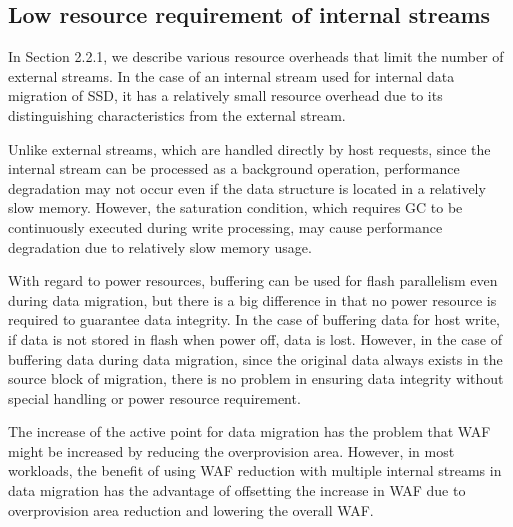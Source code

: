 \subsection{Low resource requirement of internal streams}

In Section 2.2.1, we describe various resource overheads that limit the number of external streams.
In the case of an internal stream used for internal data migration of SSD, 
it has a relatively small resource overhead due to its distinguishing characteristics from the external stream.

Unlike external streams, which are handled directly by host requests,
since the internal stream can be processed as a background operation, 
performance degradation may not occur even if the data structure is located in a relatively slow memory.
However, the saturation condition, which requires GC to be continuously executed during write processing, 
may cause performance degradation due to relatively slow memory usage.

With regard to power resources, buffering can be used for flash parallelism even during data migration, but there is a big difference in that no power resource is required to guarantee data integrity.
In the case of buffering data for host write, if data is not stored in flash when power off, data is lost. 
However, in the case of buffering data during data migration, since the original data always exists in the source block of migration, there is no problem in ensuring data integrity without special handling or power resource requirement.

The increase of the active point for data migration has the problem that WAF might be increased by reducing the overprovision area. 
However, in most workloads, the benefit of using WAF reduction with multiple internal streams in data migration has the advantage of offsetting the increase in WAF due to overprovision area reduction and lowering the overall WAF.

